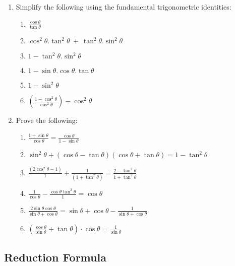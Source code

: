 {
\begin{enumerate}
	\item Simplify the following using the fundamental trigonometric identities:
	\begin{enumerate}
		\item $\frac{\cos\theta }{\tan\theta }$
		\item $\cos^2\theta.\tan^2\theta\ +\ \tan^2\theta.\sin^2\theta$
		\item $1 - \tan^2\theta.\sin^2\theta$
		\item $1 - \sin\theta.\cos\theta.\tan\theta $
		\item $1-\sin^2\theta $
		\item $\left(\frac{1 - \cos^2\theta }{\cos^2\theta }\right) - \cos^2\theta$
	\end{enumerate}
	\item Prove the following:
	\begin{enumerate}
		\item $\frac{1 + \sin\theta}{\cos\theta} = \frac{\cos\theta}{1 - \sin\theta}$
		\item $\sin^2\theta + (\cos\theta - \tan\theta)(\cos\theta + \tan\theta)  = 1 - \tan^2\theta$
		\item $\frac{(2\cos^2\theta - 1)}{1} + \frac{1}{(1 + \tan^2\theta)} = \frac{2 - \tan^2\theta}{1 + \tan^2\theta}$
		\item $\frac{1}{\cos\theta} - \frac{\cos\theta\tan^2\theta}{1} = \cos\theta$
		\item $\frac{2\sin\theta\cos\theta}{\sin\theta+\cos\theta} = \sin\theta+\cos\theta - \frac{1}{\sin\theta+\cos\theta}$
		\item $\left(\frac{\cos\theta}{\sin\theta} + \tan\theta \right)\cdot\cos\theta = \frac{1}{\sin\theta}$
	\end{enumerate}
\end{enumerate}
}%


\subsection{Reduction Formula}

